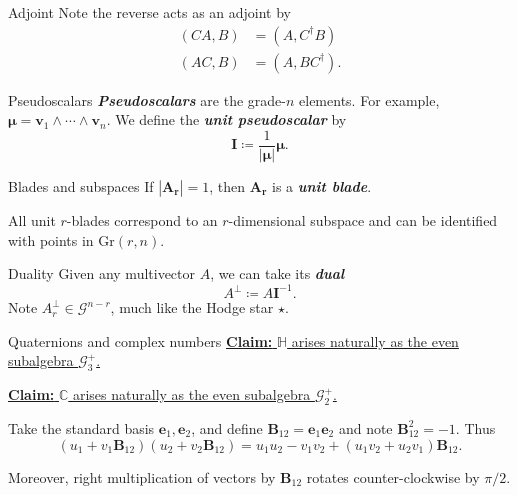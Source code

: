 \documentclass[aspectratio=169,handout]{beamer}
\newcommand\boldgreen[1]{\textcolor{lighter_csu_green}{\emph{\textbf{#1}}}}
\newcommand{\C}{\mathbb{C}}
\newcommand{\G}{\mathcal{G}}
\newcommand{\Grassmannian}[2]{\textrm{Gr}(#1,#2)}
\newcommand{\projection}{\operatorname{P}}
\newcommand{\rejection}{\operatorname{R}}
\newcommand{\blade}[1]{\boldsymbol{#1}}
\newcommand{\pseudoscalar}{\blade{I}}
\newcommand{\bivector}{\blade{B}}
\begin{document}
\begin{frame}{Adjoint}
\vfill
Note the reverse acts as an adjoint by
\begin{align}
(CA,B) &= (A,C^\dagger B)\\
(AC,B) &= (A,BC^\dagger).
\end{align}
\vfill
\end{frame}

\begin{frame}{Pseudoscalars}
\vfill
\boldgreen{Pseudoscalars} are the grade-$n$ elements. For example, $\blade{\mu} = \blade{v}_1 \wedge \cdots \wedge \blade{v}_n$.  We define the \boldgreen{unit pseudoscalar} by 
\[
\pseudoscalar \coloneqq \frac{1}{|\blade{\mu}|} \blade{\mu}.
\]
\vfill
\end{frame}

\begin{frame}{Blades and subspaces}
\vfill
If $|\blade{A_r}|=1$, then $\blade{A_r}$ is a \boldgreen{unit blade}. 

All unit $r$-blades correspond to an $r$-dimensional subspace and can be identified with points in $\Grassmannian{r}{n}$.
\vfill
\end{frame}

\begin{frame}{Duality}
\vfill
Given any multivector $A$, we can take its \boldgreen{dual}
\[
A^\perp \coloneqq A \pseudoscalar^{-1}.
\]
Note $A_r^\perp \in \G^{n-r}$, much like the Hodge star $\star$.
\vfill
\end{frame}


\begin{frame}{Quaternions and complex numbers}
\underline{\textbf{Claim:} $\mathbb{H}$ arises naturally as the even subalgebra $\G_3^+$.}

\vspace*{0.5cm}

\underline{\textbf{Claim:} $\C$ arises naturally as the even subalgebra $\G_2^+$.}\\
\vspace*{0.25cm}

Take the standard basis $\blade{e}_1,\blade{e}_2$, and define $\bivector_{12}= \blade{e}_1\blade{e}_2$ and note $\bivector_{12}^2 = -1$. Thus
\[
(u_1+v_1 \bivector_{12})(u_2 + v_2 \bivector_{12}) = u_1u_2-v_1 v_2 + (u_1 v_2+u_2v_1)\bivector_{12}.
\]

Moreover, right multiplication of vectors by $\bivector_{12}$ rotates counter-clockwise by $\pi/2$.
\vfill
\end{frame}
\end{document}
